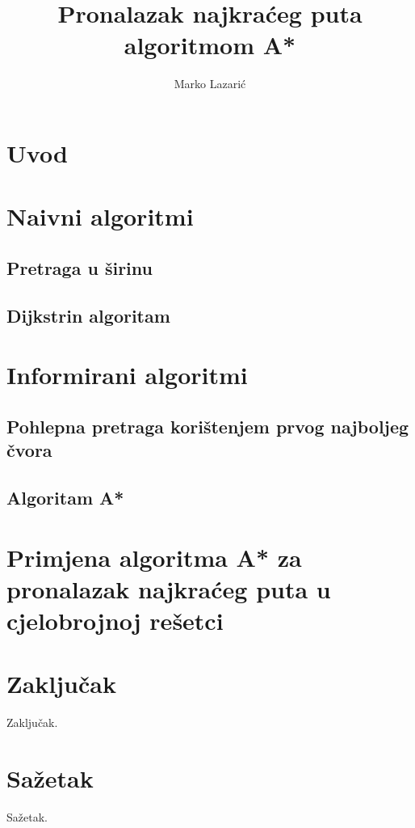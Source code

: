 \documentclass[times, utf8, seminar, numeric]{fer}
\begin{document}
\nocite{*}

\title{Pronalazak najkraćeg puta algoritmom A*}

\author{Marko Lazarić}


\maketitle

\tableofcontents

\chapter{Uvod}


\chapter{Naivni algoritmi}


\section{Pretraga u širinu}


\section{Dijkstrin algoritam}

\chapter{Informirani algoritmi}
\section{Pohlepna pretraga korištenjem prvog najboljeg čvora}
\section{Algoritam A*}

\chapter{Primjena algoritma A* za pronalazak najkraćeg puta u cjelobrojnoj rešetci}

\chapter{Zaključak}
Zaključak.




\chapter{Sažetak}
Sažetak.
\end{document}
